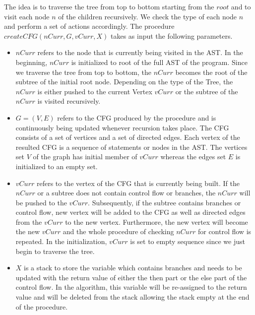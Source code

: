 The idea is to traverse the tree from top to bottom starting from the $root$ and to visit each node $n$ of the children recursively. We check the type of each node $n$ and perform a set of actions accordingly. The procedure $createCFG(nCurr, G, vCurr, X)$ takes as input the following parameters. 
\begin{itemize}
\item $nCurr$ refers to the node that is currently being visited in the AST. In the beginning, $nCurr$ is initialized to root of the full AST of the program. Since we traverse the tree from top to bottom, the $nCurr$ becomes the root of the subtree of the initial root node. Depending on the type of the Tree, the $nCurr$ is either pushed to the current Vertex $vCurr$ or the subtree of the $nCurr$ is visited recursively. 

\item $G=(V,E)$ refers to the CFG produced by the procedure and is continuously being updated whenever recursion takes place. The CFG consists of a set of vertices and a set of directed edges. Each vertex of the resulted CFG is a sequence of statements or nodes in the AST. The vertices set $V$ of the graph has initial member of $vCurr$ whereas the edges set $E$ is initialized to an empty set.   

\item $vCurr$ refers to the vertex of the CFG that is currently being built. If the $nCurr$ or a subtree does not contain control flow or branches, the $nCurr$ will be pushed to the $vCurr$. Subsequently, if the subtree contains branches or control flow, new vertex will be added to the CFG as well as directed edges from the $vCurr$ to the new vertex. Furthermore, the new vertex will become the new $vCurr$ and the whole procedure of checking $nCurr$ for control flow is repeated. In the initialization, $vCurr$ is set to empty sequence since we just begin to traverse the tree. 

\item $X$ is a stack to store the variable which contains branches and needs to be updated with the return value of either the then part or the else part of the control flow. In the algorithm, this variable will be re-assigned to the return value and will be deleted from the stack allowing the stack empty at the end of the procedure.  

\end{itemize}


